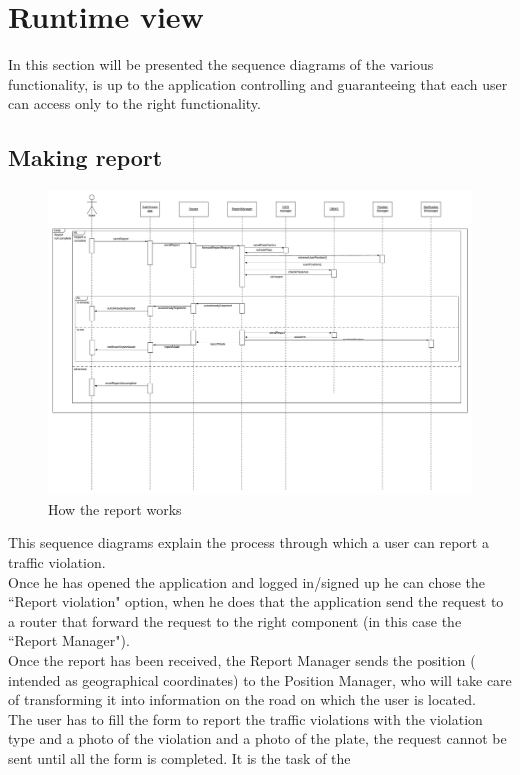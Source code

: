 \documentclass[12pt,a4paper]{report}
\begin{document}
		\section{Runtime view}
			In this section will be presented the sequence diagrams of the various functionality, is up to the application
			controlling and guaranteeing that each user can access only to the right functionality.
			\subsection{Making report}
				\begin{figure}[H]
						\includegraphics[width = 1.5\textwidth, center]{Report}
						\caption{How the report works}
						\label{fig: diagrams}
				\end{figure}
				This sequence diagrams explain the process through which a user can report a traffic violation.\\
				Once he has opened the application and logged in/signed up he can chose the ``Report violation" option,
				when he does that the application send the request to a router that forward the request to the right
				component (in this case the ``Report Manager").\\
				Once the report has been received, the Report Manager sends the position ( intended as geographical
				coordinates) to the Position Manager, who will take care of transforming it into information on the road on
				which the user is located.\\
				The user has to fill the form to report the traffic violations with the violation type and a photo of the
				violation and a photo of the plate, the request cannot be sent until all the form is completed. It is the task of the
\end{document}
